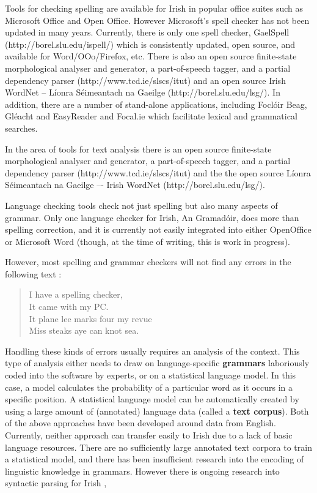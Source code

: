 \begin{multicols}{2}
Tools for checking spelling are available for Irish in popular office suites such as Microsoft Office and Open Office. However Microsoft's spell checker has not been updated in many years. Currently, there is only one spell checker, GaelSpell (http://borel.slu.edu/ispell/) which is consistently updated, open source, and available for Word/OOo/Firefox, etc. There is also an open source finite-state morphological analyser and generator, a part-of-speech tagger, and a partial dependency parser (http://www.tcd.ie/slscs/itut) and an open source Irish WordNet -- Líonra Séimeantach na Gaeilge  (http://borel.slu.edu/lsg/). In addition, there are a number of stand-alone applications, including Foclóir Beag, Gléacht and EasyReader and Focal.ie which facilitate lexical and grammatical searches. 

In the area of tools for text analysis there is an open source finite-state morphological analyser and generator, a part-of-speech tagger, and a partial dependency parser (http://www.tcd.ie/slscs/itut) and the the open source Líonra Séimeantach na Gaeilge –- Irish WordNet (http://borel.slu.edu/lsg/).

Language checking tools check not just spelling but also many aspects of grammar. Only one language checker for Irish, An Gramadóir,  \cite{gramadoir} does more than spelling correction, and it is currently not easily integrated into either OpenOffice or Microsoft Word (though, at the time of writing, this is work in progress).


However, most spelling and grammar checkers will not find any errors in the following text \cite{zar1}:

\begin{quote}
  I have a spelling checker,\\
  It came with my PC.\\
  It plane lee marks four my revue\\
  Miss steaks aye can knot sea.
\end{quote}

Handling these kinds of errors usually requires an analysis of the context. This type of analysis either needs to draw on language-specific \textbf{grammars} laboriously coded into the software by experts, or on a statistical language model. In this case, a model calculates the probability of a particular word as it occurs in a specific position. A statistical language model can be automatically created by using a large amount of (annotated) language data (called a \textbf{text corpus}). Both of the above approaches have been developed around data from English. Currently, neither approach can transfer easily to Irish due to a lack of basic language resources. There are no sufficiently large annotated text corpora to train a statistical model, and there has been insufficient research into the encoding of linguistic knowledge in grammars. However there is ongoing research into syntactic parsing for Irish \cite{lynn2012}, \cite{elaine2010}


\end{multicols}
